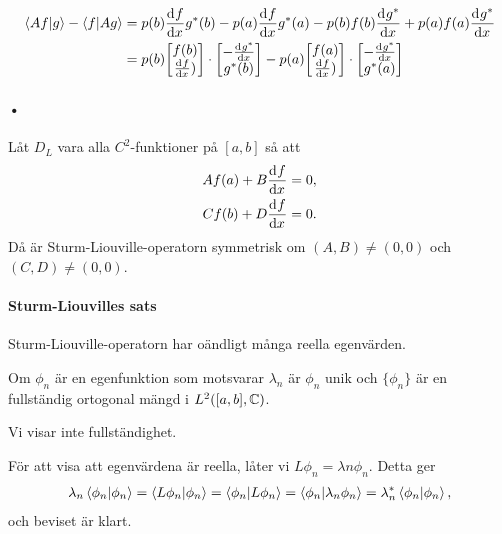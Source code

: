 \begin{align*}
	\inprod{Af}{g} - \inprod{f}{Ag} &= p(b)\deval{f}{x}{b}\cc{g}(b) - p(a)\deval{f}{x}{a}\cc{g}(a) - p(b)f(b)\deval{\cc{g}}{x}{b} + p(a)f(a)\deval{\cc{g}}{x}{a} \\
	                                &= p(b)
	                                \mqty[
	                                	f(b) \\
	                                	\deval{f}{x}{b})
	                                ]
	                                \cdot
	                                \mqty[
	                                	-\deval{\cc{g}}{x}{b} \\
	                                	\cc{g}(b)
	                                ]
	                                - p(a)
	                                \mqty[
	                                	f(a) \\
	                                	\deval{f}{x}{a})
	                                ]
	                                \cdot
	                                \mqty[
	                                	-\deval{\cc{g}}{x}{a} \\
	                                	\cc{g}(a)
	                                ]
\end{align*}

\paragraph{•}
Låt $D_{L}$ vara alla $C^{2}$-funktioner på $[a, b]$ så att
\begin{align*}
	Af(a) + B\dv[]{f}{x} (a) = 0, \\
	Cf(b) + D\dv[]{f}{x} (b) = 0.
\end{align*}
Då är Sturm-Liouville-operatorn symmetrisk om $(A, B) \neq (0, 0)$ och $(C, D) \neq (0, 0)$.

\paragraph{Sturm-Liouvilles sats}
Sturm-Liouville-operatorn har oändligt många reella egenvärden.

Om $\phi_{n}$ är en egenfunktion som motsvarar $\lambda_{n}$ är $\phi_{n}$ unik och $\{\phi_{n}\}$ är en fullständig ortogonal mängd i $L^{2}([a, b], \mathbb{C})$.

\proof
Vi visar inte fullständighet.

För att visa att egenvärdena är reella, låter vi $L\phi_{n} = \lambda{n}\phi_{n}$. Detta ger
\begin{align*}
	\lambda_{n}\bra{\phi_{n}}\ket{\phi_{n}} = \bra{L\phi_{n}}\ket{\phi_{n}} = \bra{\phi_{n}}\ket{L\phi_{n}} = \bra{\phi_{n}}\ket{\lambda_{n}\phi_{n}} = \lambda_{n}^{*}\bra{\phi_{n}}\ket{\phi_{n}},
\end{align*}
och beviset är klart.

